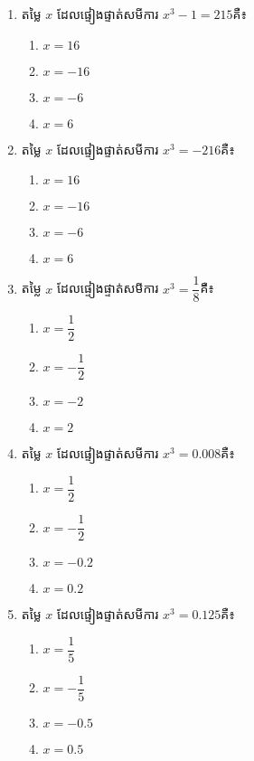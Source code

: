 \begin{enumerate}
\item តម្លៃ $x$ ដែលផ្ទៀងផ្ទាត់សមីការ $x^3-1=215$គឺ៖
\begin{multicols}{4}
\begin{enumerate}[label=\alph*.]
	\item $x=16$
	\item $x=-16$
	\item $x=-6$
	\item $x=6$
\end{enumerate}
\end{multicols}

\item តម្លៃ $x$ ដែលផ្ទៀងផ្ទាត់សមីការ $x^3=-216$គឺ៖
\begin{multicols}{4}
\begin{enumerate}[label=\alph*.]
	\item $x=16$
	\item $x=-16$
	\item $x=-6$
	\item $x=6$
\end{enumerate}
\end{multicols}
\item តម្លៃ $x$ ដែលផ្ទៀងផ្ទាត់សមីការ $x^3=\dfrac{1}{8}$គឺ៖
\begin{multicols}{4}
\begin{enumerate}[label=\alph*.]
	\item $x=\dfrac{1}{2}$
	\item $x=-\dfrac{1}{2}$
	\item $x=-2$
	\item $x=2$
\end{enumerate}
\end{multicols}

\item តម្លៃ $x$ ដែលផ្ទៀងផ្ទាត់សមីការ $x^3=0.008$គឺ៖
\begin{multicols}{4}
\begin{enumerate}[label=\alph*.]
	\item $x=\dfrac{1}{2}$
	\item $x=-\dfrac{1}{2}$
	\item $x=-0.2$
	\item $x=0.2$
\end{enumerate}
\end{multicols}
\item តម្លៃ $x$ ដែលផ្ទៀងផ្ទាត់សមីការ $x^3=0.125$គឺ៖
\begin{multicols}{4}
\begin{enumerate}[label=\alph*.]
	\item $x=\dfrac{1}{5}$
	\item $x=-\dfrac{1}{5}$
	\item $x=-0.5$
	\item $x=0.5$
\end{enumerate}
\end{multicols}


\end{enumerate}
